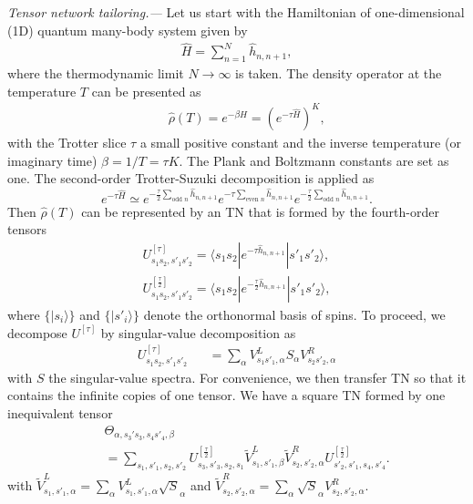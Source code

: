 \documentclass[aps,prl,twocolumn,superscriptaddress,a4paper,english,longbibliography]{revtex4-1}
\begin{document}
{\it Tensor network tailoring.---}
Let us start with the Hamiltonian of one-dimensional (1D) quantum many-body system given by 
\begin{eqnarray}\label{app-eq-H}
	\hat{H} = \sum_{n=1}^{N}\hat{h}_{n,n+1},
\end{eqnarray}
where the thermodynamic limit $N \to \infty$ is taken. The density operator at the temperature $T$ can be presented as
\begin{eqnarray}\label{app-eq-Z}
	&&\hat{\rho}(T) = e^{-\beta \hat{H}} = (e^{-\tau \hat{H}})^{K},
\end{eqnarray} 
with the Trotter slice $\tau$ a small positive constant and the inverse temperature (or imaginary time) $\beta = 1 / T = \tau K$. The Plank and Boltzmann constants are set as one. The second-order Trotter-Suzuki decomposition is applied as
\begin{equation}\label{app-eq-TS}
	e^{-\tau \hat{H}} \simeq e^{- \frac{\tau}{2}\sum_{\text{odd }n} \hat{h}_{n,n+1}} e^{-\tau \sum_{\text{even }n} \hat{h}_{n,n+1}} e^{- \frac{\tau}{2}\sum_{\text{odd }n}\hat{h}_{n,n+1}}.
\end{equation} 
Then $\hat{\rho}(T)$ can be represented by an TN that is formed by the fourth-order tensors
\begin{eqnarray}\label{app-eq-local}
	U_{s_{1}s_{2},s'_{1}s'_{2}}^{[\tau]} = \langle s_{1}s_{2}| e^{-\tau \hat{h}_{n,n+1}} |s'_{1}s'_{2}\rangle, \\
	U_{s_{1}s_{2},s'_{1}s'_{2}}^{[\frac{\tau}{2}]} = \langle s_{1}s_{2}| e^{-\frac{\tau}{2} \hat{h}_{n,n+1}} |s'_{1}s'_{2}\rangle,
\end{eqnarray} 
where $\{|s_{i}\rangle\}$ and $\{|s'_{i}\rangle\}$ denote the orthonormal basis of spins. To proceed, we decompose $U^{[\tau]}$ by singular-value decomposition as
\begin{eqnarray}\label{app-SVD}
	U_{s_{1}s_{2},s'_{1}s'_{2}}^{[\tau]}
	&& = \sum_{\alpha} V^{L}_{s_{1}s'_{1},\alpha} S_{\alpha} V^{R}_{s_{2}s'_{2},\alpha}
\end{eqnarray} 
with $S$ the singular-value spectra. For convenience, we then transfer TN so that it contains the infinite copies of one tensor. We have a square TN formed by one inequivalent tensor 
\begin{eqnarray}
	&& \Theta_{\alpha,s_{3}'s_{3},s_{4}s'_{4},\beta} \nonumber \\
	&& = \sum_{s_{1},s'_{1},s_2,s'_{2}} U^{[\frac{\tau}{2}]}_{s_3,s'_{3},s_2,s_1} \tilde{V}^{L}_{s_{1}, s'_{1}, \beta} \tilde{V}^{R}_{s_{2}, s'_{2}, \alpha} U^{[\frac{\tau}{2}]}_{s'_{2},s'_{1},s_4,s'_{4}}.
\end{eqnarray}  
with $\tilde{V}^{L}_{s_{1}, s'_{1}, \alpha} = \sum_{\alpha} V^{L}_{s_{1}, s'_{1}, \alpha} \sqrt{S}_{\alpha}$ and $\tilde{V}^{R}_{s_{2}, s'_{2}, \alpha}=\sum_{\alpha}\sqrt{S}_{\alpha} V^{R}_{s_{2}, s'_{2}, \alpha}$.
\end{document}
